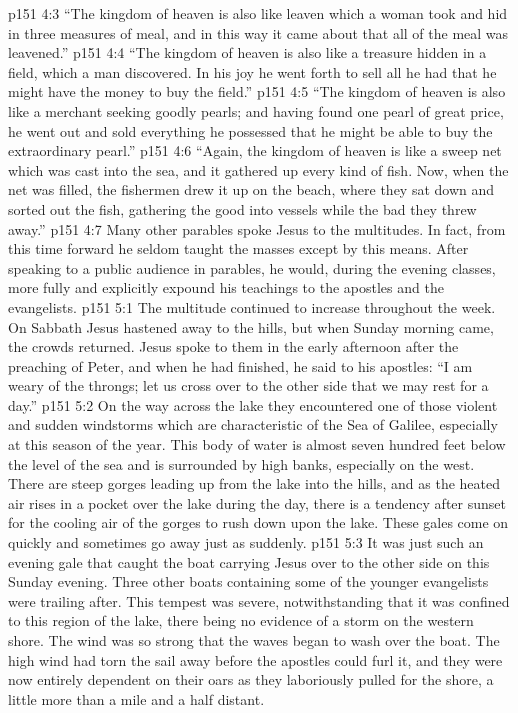 \pc \vs p151 4:3 \textcolor{ubdarkred}{“The kingdom of heaven is also like leaven which a woman took and hid in three measures of meal, and in this way it came about that all of the meal was leavened.”}
\pc \vs p151 4:4 \textcolor{ubdarkred}{“The kingdom of heaven is also like a treasure hidden in a field, which a man discovered. In his joy he went forth to sell all he had that he might have the money to buy the field.”}
\pc \vs p151 4:5 \textcolor{ubdarkred}{“The kingdom of heaven is also like a merchant seeking goodly pearls; and having found one pearl of great price, he went out and sold everything he possessed that he might be able to buy the extraordinary pearl.”}
\pc \vs p151 4:6 \textcolor{ubdarkred}{“Again, the kingdom of heaven is like a sweep net which was cast into the sea, and it gathered up every kind of fish. Now, when the net was filled, the fishermen drew it up on the beach, where they sat down and sorted out the fish, gathering the good into vessels while the bad they threw away.”}
\pc \vs p151 4:7 Many other parables spoke Jesus to the multitudes. In fact, from this time forward he seldom taught the masses except by this means. After speaking to a public audience in parables, he would, during the evening classes, more fully and explicitly expound his teachings to the apostles and the evangelists.
\vs p151 5:1 The multitude continued to increase throughout the week. On Sabbath Jesus hastened away to the hills, but when Sunday morning came, the crowds returned. Jesus spoke to them in the early afternoon after the preaching of Peter, and when he had finished, he said to his apostles: \textcolor{ubdarkred}{“I am weary of the throngs; let us cross over to the other side that we may rest for a day.”}
\vs p151 5:2 On the way across the lake they encountered one of those violent and sudden windstorms which are characteristic of the Sea of Galilee, especially at this season of the year. This body of water is almost seven hundred feet below the level of the sea and is surrounded by high banks, especially on the west. There are steep gorges leading up from the lake into the hills, and as the heated air rises in a pocket over the lake during the day, there is a tendency after sunset for the cooling air of the gorges to rush down upon the lake. These gales come on quickly and sometimes go away just as suddenly.
\vs p151 5:3 It was just such an evening gale that caught the boat carrying Jesus over to the other side on this Sunday evening. Three other boats containing some of the younger evangelists were trailing after. This tempest was severe, notwithstanding that it was confined to this region of the lake, there being no evidence of a storm on the western shore. The wind was so strong that the waves began to wash over the boat. The high wind had torn the sail away before the apostles could furl it, and they were now entirely dependent on their oars as they laboriously pulled for the shore, a little more than a mile and a half distant.
